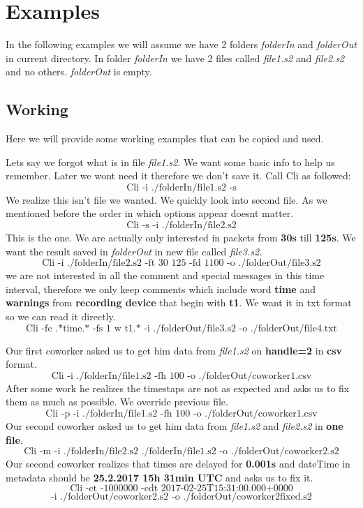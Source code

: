 \documentclass[english]{article}
\begin{document}
\section{Examples}

In the following examples we will assume we have 2 folders \textit{folderIn} and \textit{folderOut} in current directory. In folder \textit{folderIn} we have 2 files called \textit{file1.s2} and \textit{file2.s2} and no others. \textit{folderOut} is empty.

\subsection{Working}
Here we will provide some working examples that can be copied and used. 

Lets say we forgot what is in file \textit{file1.s2}. We want some basic info to help us remember. Later we wont need it therefore we don't save it. Call Cli as followed:
$$\text{Cli -i ./folderIn/file1.s2 -s}$$
We realize this isn't file we wanted. We quickly look into second file. As we mentioned before the order in which options appear doesnt matter.
$$\text{Cli -s -i ./folderIn/file2.s2}$$
This is the one. We are actually only interested in packets from \textbf{30s} till \textbf{125s}. We want the result saved in \textit{folderOut} in new file called \textit{file3.s2}.
$$\text{Cli -i ./folderIn/file2.s2 -ft 30 125 -fd 1100 -o ./folderOut/file3.s2}$$
we are not interested in all the comment and special messages in this time interval, therefore we only keep comments which include word \textbf{time} and \textbf{warnings} from \textbf{recording device} that begin with \textbf{t1}. We want it in txt format so we can read it directly.
$$\text{Cli -fc .*time.* -fs 1 w t1.* -i ./folderOut/file3.s2 -o ./folderOut/file4.txt}$$


Our first coworker asked us to get him data from \textit{file1.s2} on \textbf{handle=2} in \textbf{csv} format.
$$\text{Cli -i ./folderIn/file1.s2  -fh 100 -o ./folderOut/coworker1.csv}$$
After some work he realizes the timestaps are not as expected and asks us to fix them as much as possible. We override previous file.
$$\text{Cli -p -i ./folderIn/file1.s2 -fh 100 -o ./folderOut/coworker1.csv}$$
Our second coworker asked us to get him data from \textit{file1.s2} and \textit{file2.s2} in \textbf{one file}.
$$\text{Cli -m -i ./folderIn/file2.s2 ./folderIn/file1.s2 -o ./folderOut/coworker2.s2}$$
Our second coworker realizes that times are delayed for \textbf{0.001s} and dateTime in metadata should be \textbf{25.2.2017 15h 31min UTC} and asks us to fix it.
$$\text{Cli -ct -1000000 -cdt 2017-02-25T15:31:00.000+0000}$$ $$ \text{-i ./folderOut/coworker2.s2 -o ./folderOut/coworker2fixed.s2}$$
\end{document}
